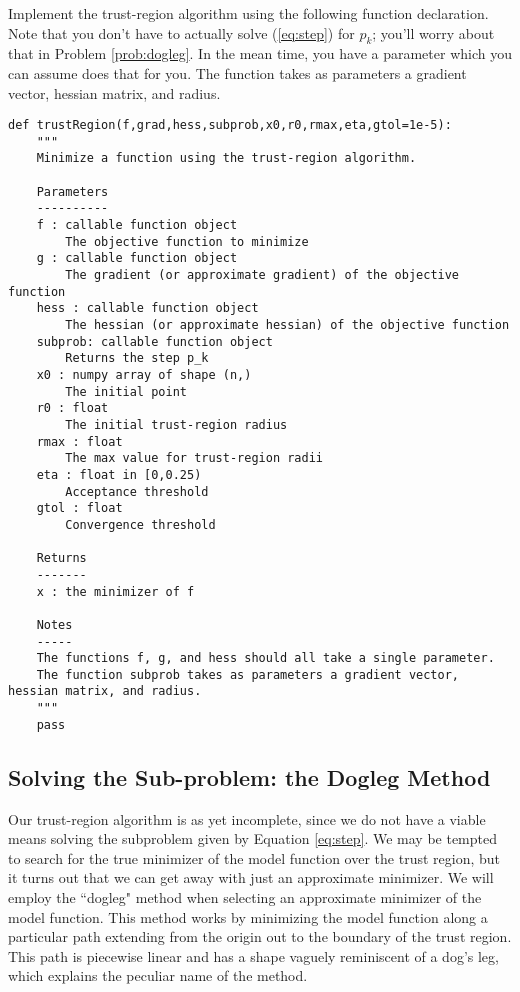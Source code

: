 \begin{problem}
Implement the trust-region algorithm using the following function declaration.  Note that you don't have to actually solve (\ref{eq:step}) for $p_k$; you'll worry about that in Problem \ref{prob:dogleg}. In the mean time, you have a parameter  which you can assume does that for you. The function  takes as parameters a gradient vector, hessian matrix, and radius.
\begin{lstlisting}
def trustRegion(f,grad,hess,subprob,x0,r0,rmax,eta,gtol=1e-5):
    """
    Minimize a function using the trust-region algorithm.

    Parameters
    ----------
    f : callable function object
        The objective function to minimize
    g : callable function object
        The gradient (or approximate gradient) of the objective function
    hess : callable function object
        The hessian (or approximate hessian) of the objective function
    subprob: callable function object
        Returns the step p_k
    x0 : numpy array of shape (n,)
        The initial point
    r0 : float
        The initial trust-region radius
    rmax : float
        The max value for trust-region radii
    eta : float in [0,0.25)
        Acceptance threshold
    gtol : float
        Convergence threshold

    Returns
    -------
    x : the minimizer of f

    Notes
    -----
    The functions f, g, and hess should all take a single parameter.
    The function subprob takes as parameters a gradient vector, hessian matrix, and radius.
    """
    pass
\end{lstlisting}
\end{problem}

\subsection*{Solving the Sub-problem: the Dogleg Method}
Our trust-region algorithm is as yet incomplete, since we do not have a viable means solving the subproblem
given by Equation \ref{eq:step}.
We may be tempted to search for the true minimizer of the model function over the trust region, but it turns out
that we can get away with just an approximate minimizer.
We will employ the ``dogleg" method when selecting an approximate minimizer of the model function.
This method works by minimizing the model function along a particular path extending from the origin out
to the boundary of the trust region.
This path is piecewise linear and has a shape vaguely reminiscent of a dog's leg, which explains the peculiar name of the method.

